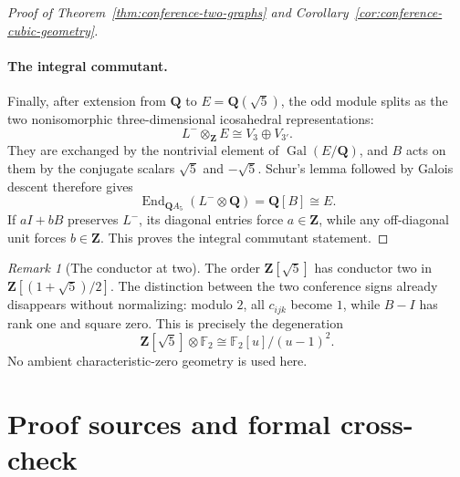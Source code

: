 \documentclass[11pt]{article}
\theoremstyle{definition}
\theoremstyle{remark}
\newtheorem{remark}[theorem]{Remark}
\newcommand{\F}{\mathbb{F}}
\begin{document}
\begin{proof}[Proof of Theorem~\ref{thm:conference-two-graphs} and
Corollary~\ref{cor:conference-cubic-geometry}]
\paragraph{The integral commutant.}
Finally, after extension from $\mathbf Q$ to
$E=\mathbf Q(\sqrt5)$, the odd module splits as the two nonisomorphic
three-dimensional icosahedral representations:
\[
 L^-\otimes_{\mathbf Z}E\cong V_3\oplus V_{3'}.
\]
They are exchanged by the nontrivial element of
$\operatorname{Gal}(E/\mathbf Q)$, and $B$ acts on them by the conjugate
scalars $\sqrt5$ and $-\sqrt5$.  Schur's lemma followed by Galois descent
therefore gives
\[
 \operatorname{End}_{\mathbf Q A_5}(L^-\otimes\mathbf Q)
 =\mathbf Q[B]\cong E.
\]
If $aI+bB$ preserves $L^-$, its diagonal entries force
$a\in\mathbf Z$, while any off-diagonal unit forces $b\in\mathbf Z$.
This proves the integral commutant statement.
\end{proof}

\begin{remark}[The conductor at two]
The order $\mathbf Z[\sqrt5]$ has conductor two in
$\mathbf Z[(1+\sqrt5)/2]$.  The distinction between the two conference signs
already disappears without normalizing: modulo $2$, all $c_{ijk}$ become $1$,
while
$B-I$ has rank one and square zero.  This is precisely the degeneration
\[
 \mathbf Z[\sqrt5]\otimes\F_2
 \cong\F_2[u]/(u-1)^2.
\]
No ambient characteristic-zero geometry is used here.
\end{remark}

\section{Proof sources and formal cross-check}
\label{sec:verification}
\end{document}
